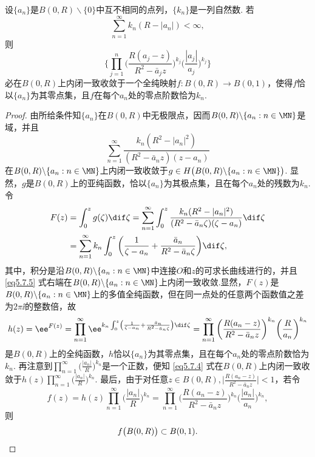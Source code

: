 \begin{theorem}\label{thm5.7.4}
设$\{a_n\}$是$B(0,R)\backslash\{0\}$中互不相同的点列，$\{k_n\}$是一列自然数. 若
\[\sum_{n=1}^\infty k_n(R-|a_n|)<\infty,\]
则
\begin{equation}\label{eq5.7.4}
\bigg\{\prod_{j=1}^n\bigg(\frac{R(a_j-z)}{R^2-\bar a_jz}\bigg)^{k_j}
\bigg(\frac{|a_j|}{a_j}\bigg)^{k_j}\bigg\}
\end{equation}
必在$B(0,R)$上内闭一致收敛于一个全纯映射$f:B(0,R)\to B(0,1)$，使得$f$恰以$\{a_n\}$为其零点集，且$f$在每个$a_n$处的零点阶数恰为$k_n$.
\end{theorem}
\begin{proof}
由所给条件知$\{a_n\}$在$B(0,R)$中无极限点，因而$B(0,R)\backslash\{a_n:n\in\MN\}$是域，并且
\[\sum_{n=1}^\infty\frac{k_n(R^2-|a_n|^2)}{(R^2-\bar a_nz)(z-a_n)}\]
在$B(0,R)\backslash\{a_n:n\in\MN\}$上内闭一致收敛于$g\in H\big(B(0,R)\backslash
\{a_n:n\in\MN\}\big)$. 显然，$g$是$B(0,R)$上的亚纯函数，恰以$\{a_n\}$为其极点集，且在每个$a_n$处的残数为$k_n$. 令
\begin{equation}\label{eq5.7.5}
\begin{aligned}
F(z)&=\int_0^zg(\zeta)\dif \zeta=\sum_{n=1}^\infty\int_0^z
\frac{k_n(R^2-|a_n|^2)}{(R^2-\bar a_n\zeta)(\zeta-a_n)}\dif \zeta\\
&=\sum_{n=1}^\infty k_n\int_0^z\bigg(\frac1{\zeta-a_n}+\frac{\bar a_n}{R^2
-\bar a_n\zeta}\bigg)\dif \zeta,
\end{aligned}
\end{equation}
其中，积分是沿$B(0,R)\backslash\{a_n:n\in\MN\}$中连接$O$和$z$的可求长曲线进行的，并且 \eqref{eq5.7.5} 式右端在$B(0,R)\backslash\{a_n:n\in\MN\}$上内闭一致收敛.显然，$F(z)$是$B(0,R)\backslash\{a_n:n\in\MN\}$上的多值全纯函数，但在同一点处的任意两个函数值之差为$2\pi\ii$的整数倍，故
\[h(z)=\ee^{F(z)}=\prod_{n=1}^\infty\ee^{k_n\int_0^z\left(\frac1{\zeta-a_n}
+\frac{\bar a_n}{R^2-\bar a_n\zeta}\right)\dif \zeta}
=\prod_{n=1}^\infty\bigg(\frac{R(a_n-z)}{R^2-\bar a_nz}\bigg)^{k_n}
\bigg(\frac{R}{a_n}\bigg)^{k_n}\]
是$B(0,R)$上的全纯函数，$h$恰以$\{a_n\}$为其零点集，且在每个$a_n$处的零点阶数恰为$k_n$. 再注意到$\prod_{n=1}^\infty\bigg(\frac{|a_n|}{R}\bigg)^{k_n}$是一个正数，便知 \eqref{eq5.7.4} 式在$B(0,R)$上内闭一致收敛于$h(z)\prod_{n=1}^\infty\bigg(\frac{|a_n|}{R}\bigg)^{k_n}$. 最后，由于对任意$z\in B(0,R),\bigg|\frac{R(a_n-z)}{R^2-\bar a_nz}\bigg|<1$，若令
\[f(z)=h(z)\prod_{n=1}^\infty\bigg(\frac{|a_n|}{R}\bigg)^{k_n}
=\prod_{n=1}^\infty\bigg(\frac{R(a_n-z)}{R^2-\bar a_nz}\bigg)^{k_n}
\bigg(\frac{|a_n|}{a_n}\bigg)^{k_n},\]
则
\begin{equation*}
  f\big(B(0,R)\big)\subset B(0,1). \qedhere
\end{equation*}
\end{proof}


